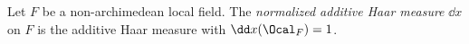 Let $F$ be a non-archimedean local field. The \emph{normalized additive Haar measure} $\dd x$ on $F$ is the additive
Haar measure with $\dd x(\Ocal_F)=1$.
